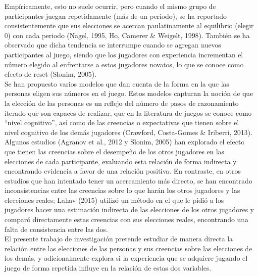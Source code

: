 Empíricamente, esto no suele ocurrir, pero cuando el mismo grupo de participantes juegan repetidamente (más de un periodo), se ha reportado consistentemente que sus elecciones se acercan paulatinamente al equilibrio (elegir 0) con cada periodo (Nagel, 1995, Ho, Camerer & Weigelt, 1998). También se ha observado que dicha tendencia se interrumpe cuando se agregan nuevos participantes al juego, siendo que los jugadores con experiencia incrementan el número elegido al enfrentarse a estos jugadores novatos, lo que se conoce como efecto de reset (Slonim, 2005).\\

Se han propuesto varios modelos que dan cuenta de la forma en la que las personas eligen sus números en el juego. Estos modelos capturan la noción de que la elección de las personas es un reflejo del número de pasos de razonamiento iterado que son capaces de realizar, que en la literatura de juegos se conoce como “nivel cognitivo”, así como de las creencias o expectativas que tienen sobre el nivel cognitivo de los demás jugadores (Crawford, Costa-Gomes & Iriberri, 2013).\\

Algunos estudios (Agranov et al., 2012 y Slonim, 2005)  han explorado el efecto que tienen las creencias sobre el desempeño de los otros jugadores en las elecciones de cada participante, evaluando esta relación de forma indirecta y encontrando evidencia a favor de una relación positiva. En contraste, en otros estudios que han intentado tener un acercamiento más directo, se han encontrado inconsistencias entre las creencias sobre lo que harán los otros jugadores y las elecciones reales; Lahav (2015) utilizó un método en el que le pidió a los jugadores hacer una estimación indirecta de las elecciones de los otros jugadores y comparó directamente estas creencias con sus elecciones reales, encontrando una falta de consistencia entre las dos.\\

El presente trabajo de investigación pretende estudiar de manera directa la relación entre las elecciones de las personas y sus creencias sobre las elecciones de los demás, y adicionalmente explora si la experiencia que se adquiere jugando el juego de forma repetida influye en la relación de estas dos variables.\\

